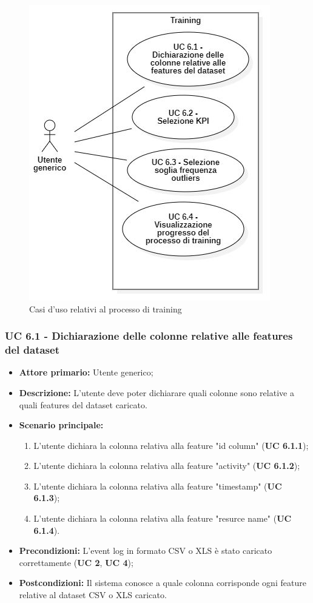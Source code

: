 \begin{figure}[H]
    \centering
    \includegraphics[scale=0.6]{immagini/usecase/cd3.JPG}
    \caption{Casi d'uso relativi al processo di training}
\end{figure}

\subsubsection{UC 6.1 - Dichiarazione delle colonne relative alle features del dataset}
\begin{itemize}
	\item \textbf{Attore primario:} Utente generico;
	\item \textbf{Descrizione:} L'utente deve poter dichiarare quali colonne sono relative a quali features del dataset caricato.
	\item \textbf{Scenario principale:} 
		\begin{enumerate}
			\item L'utente dichiara la colonna relativa alla feature "id column" (\textbf{UC 6.1.1});
			\item L'utente dichiara la colonna relativa alla feature "activity" (\textbf{UC 6.1.2});
			\item L'utente dichiara la colonna relativa alla feature "timestamp" (\textbf{UC 6.1.3});
			\item L'utente dichiara la colonna relativa alla feature "resurce name" (\textbf{UC 6.1.4}).
		\end{enumerate}
	
	\item \textbf{Precondizioni:} L'event log in formato CSV o XLS è stato caricato correttamente (\textbf{UC 2}, \textbf{UC 4});
	\item \textbf{Postcondizioni:} Il sistema conosce a quale colonna corrisponde ogni feature relative al dataset CSV o XLS caricato.
\end{itemize}

